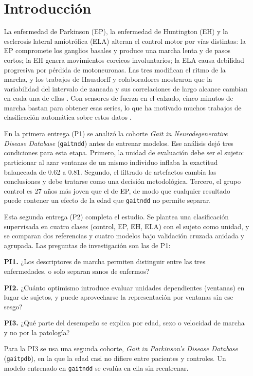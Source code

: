 \documentclass[conference]{IEEEtran}
\newcommand{\gaitndd}{\texttt{gaitndd}}
\newcommand{\gaitpdb}{\texttt{gaitpdb}}
\begin{document}
\section{Introducción}

La enfermedad de Parkinson (EP), la enfermedad de Huntington (EH) y la esclerosis lateral amiotrófica (ELA) alteran el control motor por vías distintas: la EP compromete los ganglios basales y produce una marcha lenta y de pasos cortos; la EH genera movimientos coreicos involuntarios; la ELA causa debilidad progresiva por pérdida de motoneuronas. Las tres modifican el ritmo de la marcha, y los trabajos de Hausdorff y colaboradores mostraron que la variabilidad del intervalo de zancada y sus correlaciones de largo alcance cambian en cada una de ellas \cite{hausdorff1997,hausdorff2000,hausdorff2005}. Con sensores de fuerza en el calzado, cinco minutos de marcha bastan para obtener esas series, lo que ha motivado muchos trabajos de clasificación automática sobre estos datos \cite{gaitsurvey2024}.

En la primera entrega (P1) se analizó la cohorte \textit{Gait in Neurodegenerative Disease Database} (\gaitndd) antes de entrenar modelos. Ese análisis dejó tres condiciones para esta etapa. Primero, la unidad de evaluación debe ser el sujeto: particionar al azar ventanas de un mismo individuo inflaba la exactitud balanceada de 0.62 a 0.81. Segundo, el filtrado de artefactos cambia las conclusiones y debe tratarse como una decisión metodológica. Tercero, el grupo control es 27 años más joven que el de EP, de modo que cualquier resultado puede contener un efecto de la edad que \gaitndd{} no permite separar.

Esta segunda entrega (P2) completa el estudio. Se plantea una clasificación supervisada en cuatro clases (control, EP, EH, ELA) con el sujeto como unidad, y se comparan dos referencias y cuatro modelos bajo validación cruzada anidada y agrupada. Las preguntas de investigación son las de P1:

\textbf{PI1.} ¿Los descriptores de marcha permiten distinguir entre las tres enfermedades, o solo separan sanos de enfermos?

\textbf{PI2.} ¿Cuánto optimismo introduce evaluar unidades dependientes (ventanas) en lugar de sujetos, y puede aprovecharse la representación por ventanas sin ese sesgo?

\textbf{PI3.} ¿Qué parte del desempeño se explica por edad, sexo o velocidad de marcha y no por la patología?

Para la PI3 se usa una segunda cohorte, \textit{Gait in Parkinson's Disease Database} (\gaitpdb), en la que la edad casi no difiere entre pacientes y controles. Un modelo entrenado en \gaitndd{} se evalúa en ella sin reentrenar.
\end{document}

